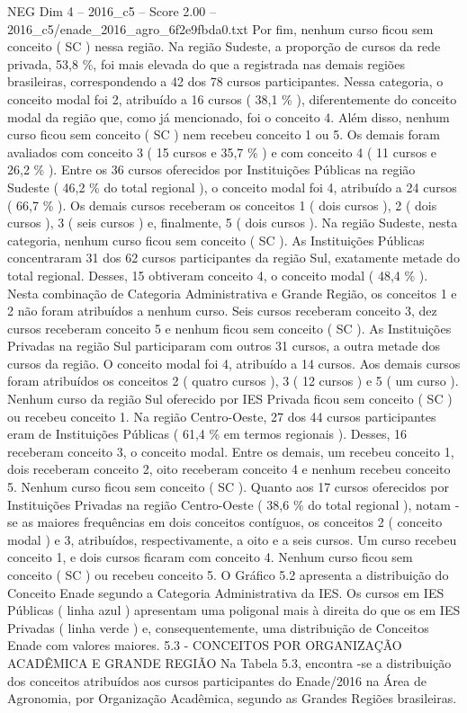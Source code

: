 \begin{textsample}{NEG Dim 4 – 2016\_c5 – Score 2.00 – 2016\_c5/enade\_2016\_agro\_6f2e9fbda0.txt}
Por fim, nenhum curso ficou sem conceito ( SC ) nessa região.
Na região Sudeste, a proporção de cursos da rede privada, 53,8 \%, foi mais elevada do que a registrada nas demais regiões brasileiras, correspondendo a 42 dos 78 cursos participantes.
Nessa categoria, o conceito modal foi 2, atribuído a 16 cursos ( 38,1 \% ), diferentemente do conceito modal da região que, como já mencionado, foi o conceito 4.
Além disso, nenhum curso ficou sem conceito ( SC ) nem recebeu conceito 1 ou 5.
Os demais foram avaliados com conceito 3 ( 15 cursos e 35,7 \% ) e com conceito 4 ( 11 cursos e 26,2 \% ).
Entre os 36 cursos oferecidos por Instituições Públicas na região Sudeste ( 46,2 \% do total regional ), o conceito modal foi 4, atribuído a 24 cursos ( 66,7 \% ).
Os demais cursos receberam os conceitos 1 ( dois cursos ), 2 ( dois cursos ), 3 ( seis cursos ) e, finalmente, 5 ( dois cursos ).
Na região Sudeste, nesta categoria, nenhum curso ficou sem conceito ( SC ).
As Instituições Públicas concentraram 31 dos 62 cursos participantes da região Sul, exatamente metade do total regional.
Desses, 15 obtiveram conceito 4, o conceito modal ( 48,4 \% ).
Nesta combinação de Categoria Administrativa e Grande Região, os conceitos 1 e 2 não foram atribuídos a nenhum curso.
Seis cursos receberam conceito 3, dez cursos receberam conceito 5 e nenhum ficou sem conceito ( SC ).
As Instituições Privadas na região Sul participaram com outros 31 cursos, a outra metade dos cursos da região.
O conceito modal foi 4, atribuído a 14 cursos.
Aos demais cursos foram atribuídos os conceitos 2 ( quatro cursos ), 3 ( 12 cursos ) e 5 ( um curso ).
Nenhum curso da região Sul oferecido por IES Privada ficou sem conceito ( SC ) ou recebeu conceito 1.
Na região Centro-Oeste, 27 dos 44 cursos participantes eram de Instituições Públicas ( 61,4 \% em termos regionais ).
Desses, 16 receberam conceito 3, o conceito modal.
Entre os demais, um recebeu conceito 1, dois receberam conceito 2, oito receberam conceito 4 e nenhum recebeu conceito 5.
Nenhum curso ficou sem conceito ( SC ).
Quanto aos 17 cursos oferecidos por Instituições Privadas na região Centro-Oeste ( 38,6 \% do total regional ), notam -se as maiores frequências em dois conceitos contíguos, os conceitos 2 ( conceito modal ) e 3, atribuídos, respectivamente, a oito e a seis cursos.
Um curso recebeu conceito 1, e dois cursos ficaram com conceito 4.
Nenhum curso ficou sem conceito ( SC ) ou recebeu conceito 5.
O Gráfico 5.2 apresenta a distribuição do Conceito Enade segundo a Categoria Administrativa da IES.
Os cursos em IES Públicas ( linha azul ) apresentam uma poligonal mais à direita do que os em IES Privadas ( linha verde ) e, consequentemente, uma distribuição de Conceitos Enade com valores maiores. 5.3 - CONCEITOS POR ORGANIZAÇÃO ACADÊMICA E GRANDE REGIÃO Na Tabela 5.3, encontra -se a distribuição dos conceitos atribuídos aos cursos participantes do Enade/2016 na Área de Agronomia, por Organização Acadêmica, segundo as Grandes Regiões brasileiras.

\end{textsample}
